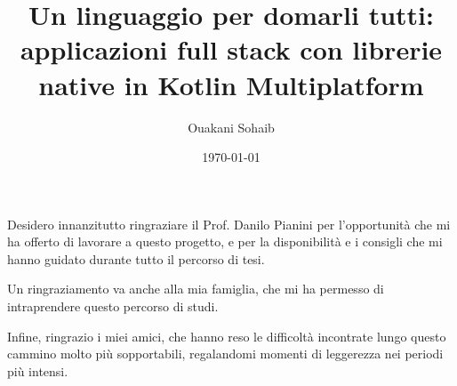 \documentclass[12pt,a4paper,openright,twoside]{book}
\title{Un linguaggio per domarli tutti: applicazioni full stack con librerie native in Kotlin Multiplatform}
\author{Ouakani Sohaib}
\date{\today}
\begin{document}


\backmatter
\listoffigures        %



\begin{acknowledgements}
Desidero innanzitutto ringraziare il Prof. Danilo Pianini per l'opportunità che mi ha offerto di lavorare a questo progetto, e per la disponibilità e i consigli che mi hanno guidato durante tutto il percorso di tesi.

Un ringraziamento va anche alla mia famiglia, che mi ha permesso di intraprendere questo percorso di studi.

Infine, ringrazio i miei amici, che hanno reso le difficoltà incontrate lungo questo cammino molto più sopportabili, regalandomi momenti di leggerezza nei periodi più intensi.
\end{acknowledgements}
\end{document}
